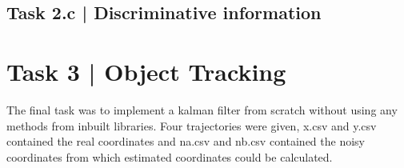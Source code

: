 \documentclass[conference]{IEEEtran}
\begin{document}
    \subsection*{Task 2.c | Discriminative information}



\section*{Task 3 | Object Tracking}

    The final task was to implement a kalman filter from scratch without using any methods from inbuilt libraries. Four trajectories were given,
    x.csv and y.csv contained the real coordinates and na.csv and nb.csv contained the noisy coordinates from which estimated coordinates could 
    be calculated.
    
\end{document}
